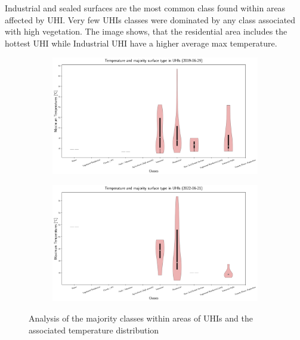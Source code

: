 \documentclass[12pt,a4paper, english,twoside]{scrartcl}
\begin{document}
      Industrial and sealed surfaces are the most common class found within areas affected by \gls{UHI}.
      Very few \glspl{UHI} classes were dominated by any class associated with high vegetation.
      The image shows, that the residential area includes the hottest \gls{UHI} while Industrial UHI have a higher average max temperature. 
      \begin{figure}[!htbp]
      \begin{subfigure}[b]{\textwidth}
        \centering
        \includegraphics[width=\textwidth]{img/Temperature and majority surface type in UHIs (2019-06-29).png}
        \label{fig:majorityClasses}
      \end{subfigure}

      \begin{subfigure}[b]{\textwidth}
        \centering
        \includegraphics[width=\textwidth]{img/Temperature and majority surface type in UHIs (2022-06-21).png}
        \label{fig:majorityClasses2}
      \end{subfigure}
      \caption{Analysis of the majority classes within areas of \glspl{UHI} and the associated temperature distribution\label{fig:tempInUHIs}}
      \end{figure}  
      
\end{document}
